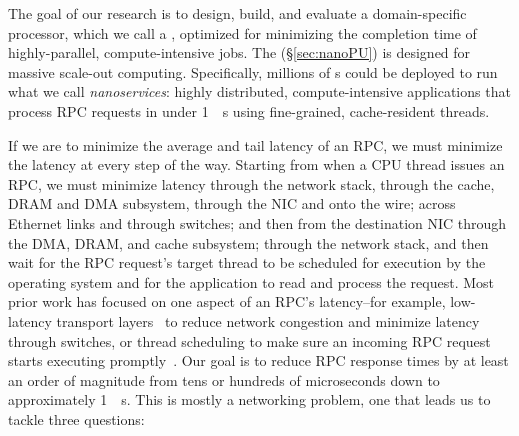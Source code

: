 The goal of our research is to design, build, and evaluate a domain-specific processor, which we call a {\em \name{}}, optimized for minimizing the completion time of highly-parallel, compute-intensive jobs. The \name{} (\S\ref{sec:nanoPU}) is designed for massive scale-out computing. 
Specifically, millions of \name{}s could be deployed to run what we call {\em nanoservices}: highly distributed, compute-intensive applications that process RPC requests in under \SI{1}{\mu s} using fine-grained, cache-resident threads.

If we are to minimize the average and tail latency of an RPC, we must minimize the latency at every step of the way. 
Starting from when a CPU thread issues an RPC, we must minimize latency through the network stack, through the cache, DRAM and DMA subsystem, through the NIC and onto the wire; across Ethernet links and through switches; and then from the destination NIC through the DMA, DRAM, and cache subsystem; through the network stack, and then wait for the RPC request's target thread to be scheduled for execution by the operating system and for the application to read and process the request.
Most prior work has focused on one aspect of an RPC's latency--for example, low-latency transport layers~\cite{homa, ndp, pfabric} to reduce network congestion and minimize latency through switches, or thread scheduling to make sure an incoming RPC request starts executing promptly~\cite{shinjuku, shenango}. 
Our goal is to reduce RPC response times by at least an order of magnitude from tens or hundreds of microseconds down to approximately \SI{1}{\mu s}. 
This is mostly a networking problem, one that leads us to tackle three questions:

